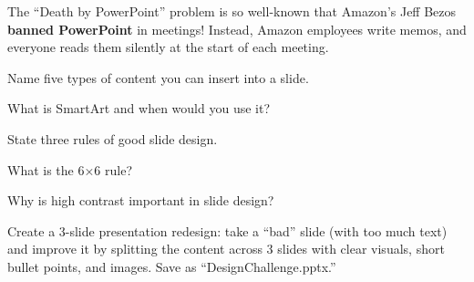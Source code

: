 
\begin{funfact}
The ``Death by PowerPoint'' problem is so well-known that Amazon's Jeff Bezos \textbf{banned PowerPoint} in meetings! Instead, Amazon employees write memos, and everyone reads them silently at the start of each meeting.
\end{funfact}

\begin{reviewqs}
  \item Name five types of content you can insert into a slide.
  \item What is SmartArt and when would you use it?
  \item State three rules of good slide design.
  \item What is the 6×6 rule?
  \item Why is high contrast important in slide design?
\end{reviewqs}

\begin{challenge}
Create a 3-slide presentation redesign: take a ``bad'' slide (with too much text) and improve it by splitting the content across 3 slides with clear visuals, short bullet points, and images. Save as ``DesignChallenge.pptx.''
\end{challenge}
